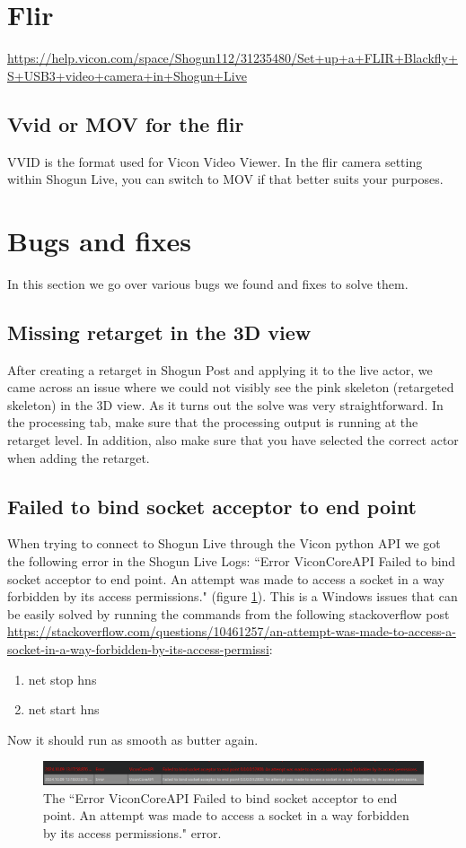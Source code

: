 \documentclass{uva-inf-article}
\begin{document}
\section{Flir}
\url{https://help.vicon.com/space/Shogun112/31235480/Set+up+a+FLIR+Blackfly+S+USB3+video+camera+in+Shogun+Live}

\subsection{Vvid or MOV for the flir}
VVID is the format used for Vicon Video Viewer. In the flir camera setting within Shogun Live, you can switch to MOV if that better suits your purposes.


\section{Bugs and fixes}
In this section we go over various bugs we found and fixes to solve them.

\subsection{Missing retarget in the 3D view}
After creating a retarget in Shogun Post and applying it to the live actor, we came across an issue where we could not visibly see the pink skeleton (retargeted skeleton) in the 3D view. As it turns out the solve was very straightforward. In the processing tab, make sure that the processing output is running at the retarget level.
In addition, also make sure that you have selected the correct actor when adding the retarget.

\subsection{Failed to bind socket acceptor to end point}
When trying to connect to Shogun Live through the Vicon python API we got the following error in the Shogun Live Logs: ``Error ViconCoreAPI Failed to bind socket acceptor to end point. An attempt was made to access a socket in a way forbidden by its access permissions." (figure \ref{fig:socketError}).
This is a Windows issues that can be easily solved by running the commands from the following stackoverflow post \url{https://stackoverflow.com/questions/10461257/an-attempt-was-made-to-access-a-socket-in-a-way-forbidden-by-its-access-permissi}:
\begin{enumerate}
    \item net stop hns
    \item net start hns
\end{enumerate}
Now it should run as smooth as butter again.
\begin{figure}[hbt!]
    \centering
    \includegraphics[width=.9\textwidth]{imgs/socketError.png}
    \caption{The ``Error ViconCoreAPI Failed to bind socket acceptor to end point. An attempt was made to access a socket in a way forbidden by its access permissions." error.}
    \label{fig:socketError}
\end{figure}
\end{document}
